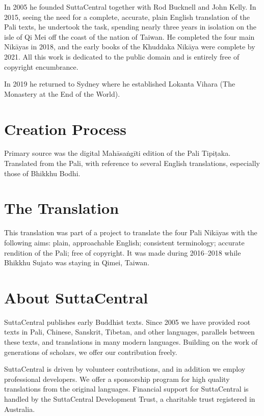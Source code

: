 \documentclass[12pt,openany]{book}%
\begin{document}
In 2005 he founded SuttaCentral together with Rod Bucknell and John Kelly. In 2015, seeing the need for a complete, accurate, plain English translation of the Pali texts, he undertook the task, spending nearly three years in isolation on the isle of Qi Mei off the coast of the nation of Taiwan. He completed the four main \textsanskrit{Nikāyas} in 2018, and the early books of the Khuddaka \textsanskrit{Nikāya} were complete by 2021. All this work is dedicated to the public domain and is entirely free of copyright encumbrance. 

In 2019 he returned to Sydney where he established Lokanta Vihara (The Monastery at the End of the World). 

\section*{Creation Process}

Primary source was the digital \textsanskrit{Mahāsaṅgīti} edition of the Pali \textsanskrit{Tipiṭaka}. Translated from the Pali, with reference to several English translations, especially those of Bhikkhu Bodhi.

\section*{The Translation}

This translation was part of a project to translate the four Pali \textsanskrit{Nikāyas} with the following aims: plain, approachable English; consistent terminology; accurate rendition of the Pali; free of copyright. It was made during 2016–2018 while Bhikkhu Sujato was staying in Qimei, Taiwan.

\section*{About SuttaCentral}

SuttaCentral publishes early Buddhist texts. Since 2005 we have provided root texts in Pali, Chinese, Sanskrit, Tibetan, and other languages, parallels between these texts, and translations in many modern languages. Building on the work of generations of scholars, we offer our contribution freely.

SuttaCentral is driven by volunteer contributions, and in addition we employ professional developers. We offer a sponsorship program for high quality translations from the original languages. Financial support for SuttaCentral is handled by the SuttaCentral Development Trust, a charitable trust registered in Australia.
\end{document}

